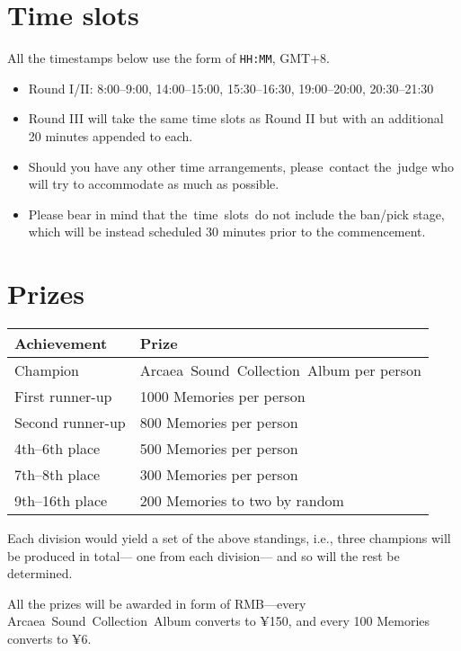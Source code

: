 \documentclass{article}
\begin{document}
\section{Time slots}

All the timestamps below use the form of
\texttt{HH:MM}, GMT+8.

\begin{itemize}
	\item Round I/II: 8:00--9:00, 14:00--15:00, 15:30--16:30, 19:00--20:00, 20:30--21:30

	\item Round III will take the same time slots as Round II
	      but with an additional 20 minutes appended to each.

	\item Should you have any other time arrangements,
	      please contact the judge who will
	      try to accommodate as much as possible.

	\item Please bear in mind that
	      the time slots do not include the ban/pick stage,
	      which will be instead scheduled 30 minutes prior to the commencement.
\end{itemize}

\section{Prizes}

\begin{table}[!htbp]
	\centering
	\begin{tabular}{ll}
		\hline
		Achievement  %
		                 & Prize                                    \\ \hline
		Champion         & Arcaea Sound Collection Album per person \\
		First runner-up  & 1000 Memories per person                 \\
		Second runner-up & 800 Memories per person                  \\
		4th--6th place   & 500 Memories per person                  \\
		7th--8th place   & 300 Memories per person                  \\
		9th--16th place  & 200 Memories to two by random            \\ \hline
	\end{tabular}
\end{table}

Each division would yield a set of the above standings,
i.e.,
three champions will be produced in total---%
one from each division---%
and so will the rest be determined.

All the prizes will be awarded in form of  %
RMB---every Arcaea Sound Collection Album converts to ¥150,
and every 100 Memories converts  %
to ¥6.
\end{document}
